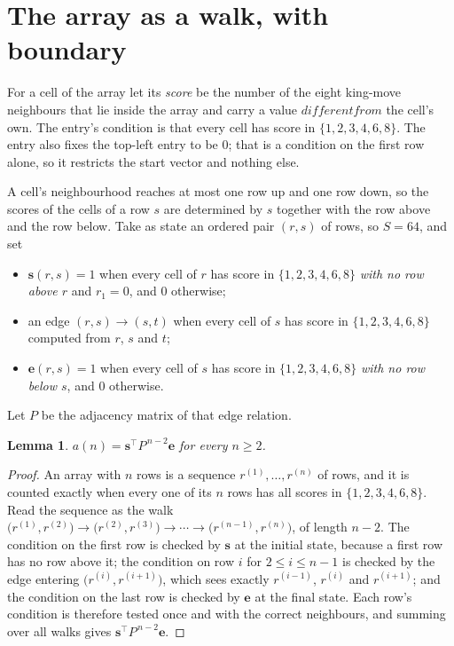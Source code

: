 \documentclass[11pt,a4paper]{article}
\theoremstyle{plain}
\newtheorem{lemma}[theorem]{Lemma}
\theoremstyle{definition}
\begin{document}
\section{The array as a walk, with boundary}

For a cell of the array let its \emph{score} be the number of the eight king-move neighbours that lie inside
the array and carry a value $different from$ the cell's own. The entry's condition is that every cell
has score in $\{1,2,3,4,6,8\}$. The entry also fixes the top-left entry to be $0$; that is a condition on the first row alone, so it restricts the start vector and nothing else.

A cell's neighbourhood reaches at most one row up and one row down, so the scores of the
cells of a row $s$ are determined by $s$ together with the row above and the row below.
Take as state an ordered pair $(r,s)$ of rows, so $S=64$, and set
\begin{itemize}
\item $\mathbf{s}(r,s)=1$ when every cell of $r$ has score in $\{1,2,3,4,6,8\}$ \emph{with no row
above $r$} and $r_1=0$, and $0$ otherwise;
\item an edge $(r,s)\to(s,t)$ when every cell of $s$ has score in $\{1,2,3,4,6,8\}$ computed from
$r$, $s$ and $t$;
\item $\mathbf{e}(r,s)=1$ when every cell of $s$ has score in $\{1,2,3,4,6,8\}$ \emph{with no row
below $s$}, and $0$ otherwise.
\end{itemize}
Let $P$ be the adjacency matrix of that edge relation.

\begin{lemma}\label{lem:walk}
$a(n)=\mathbf{s}^{\!\top}P^{\,n-2}\mathbf{e}$ for every $n\ge2$.
\end{lemma}

\begin{proof}
An array with $n$ rows is a sequence $r^{(1)},\dots,r^{(n)}$ of rows, and it is counted
exactly when every one of its $n$ rows has all scores in $\{1,2,3,4,6,8\}$. Read the sequence as the
walk $\bigl(r^{(1)},r^{(2)}\bigr)\to\bigl(r^{(2)},r^{(3)}\bigr)\to\cdots\to
\bigl(r^{(n-1)},r^{(n)}\bigr)$, of length $n-2$. The condition on the first row is
checked by $\mathbf{s}$ at the initial state, because a first row has no row above it; the
condition on row $i$ for $2\le i\le n-1$ is checked by the edge entering
$\bigl(r^{(i)},r^{(i+1)}\bigr)$, which sees exactly $r^{(i-1)}$, $r^{(i)}$ and
$r^{(i+1)}$; and the condition on the last row is checked by $\mathbf{e}$ at the final
state. Each row's condition is therefore tested once and with the correct neighbours, and
summing over all walks gives $\mathbf{s}^{\!\top}P^{\,n-2}\mathbf{e}$.
\end{proof}
\end{document}
